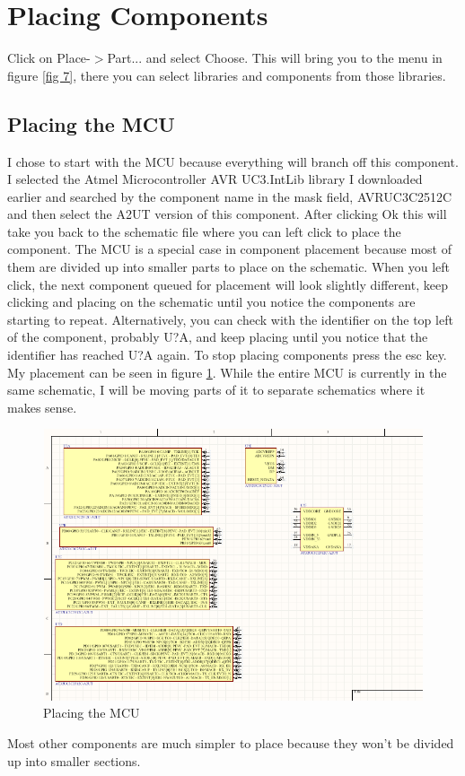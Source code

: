 \documentclass{report}
\begin{document}
	\section{Placing Components}
	Click on Place-$>$Part... and select Choose. This will bring you to the menu in figure \ref{fig 7}, there you can select libraries and components from those libraries.
	\subsection{Placing the MCU}
	I chose to start with the MCU because everything will branch off this component. I selected the Atmel Microcontroller AVR UC3.IntLib library I downloaded earlier and searched by the component name in the mask field, AVRUC3C2512C and then select the A2UT version of this component. After clicking Ok this will take you back to the schematic file where you can left click to place the component. The MCU is a special case in component placement because most of them are divided up into smaller parts to place on the schematic. When you left click, the next component queued for placement will look slightly different, keep clicking and placing on the schematic until you notice the components are starting to repeat. Alternatively, you can check with the identifier on the top left of the component, probably U?A, and keep placing until you notice that the identifier has reached U?A again. To stop placing components press the esc key. My placement can be seen in figure \ref{fig 9}. While the entire MCU is currently in the same schematic, I will be moving parts of it to separate schematics where it makes sense.
	
	\begin{figure}[H]	
		\centering
		\includegraphics[width=16cm, height=8cm]{pics/mcu_place.png}
		\caption{Placing the MCU}
		\label{fig 9}
	\end{figure}
	Most other components are much simpler to place because they won't be divided up into smaller sections.
	
\end{document}
